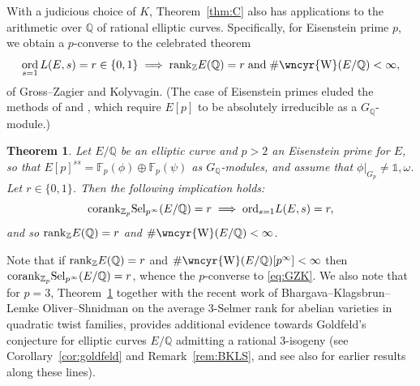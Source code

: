 \documentclass[10pt]{amsart}
\newcommand{\sha}{\text{\wncyr{W}}}
\numberwithin{equation}{section}
\newtheorem{theorem}{Theorem}
\theoremstyle{definition}
\theoremstyle{remark}
\newcommand{\Z}{\mathbb{Z}}
\newcommand{\bQ}{\mathbb{Q}}
\newcommand{\Q}{\mathbb{Q}}
\DeclareMathOperator{\ord}{ord}
\begin{document}
With a judicious choice of $K$, Theorem~\ref{thm:C} also has applications to the arithmetic over $\Q$ of rational elliptic curves. Specifically, for Eisenstein prime $p$, we obtain a $p$-converse to the celebrated theorem 
\begin{equation}\label{eq:GZK}
\ord_{s=1}L(E,s)=r \in \{0,1\}\;\Longrightarrow\;
{\rm rank}_\Z E(\Q)=r\;\textrm{and}\;
\#\sha(E/\bQ)<\infty,
\end{equation}
of Gross--Zagier and Kolyvagin. (The case of Eisenstein primes eluded the methods of 
\cite{pCONVskinner} and \cite{wei-zhang}, which require $E[p]$ to be absolutely irreducible as a $G_\bQ$-module.)

\begin{theorem}\label{thm:E}
Let $E/\mathbb{Q}$ be an elliptic curve and $p>2$ an Eisenstein prime for $E$, so that $E[p]^{ss}=\mathbb{F}_p(\phi)\oplus\mathbb{F}_p(\psi)$ as $G_\Q$-modules, and assume that $\phi\vert_{G_p}\neq\mathds{1},\omega$. Let $r\in\{0,1\}$. Then the following implication holds:
\[
{\rm corank}_{\Z_p}{\rm Sel}_{p^\infty}(E/\Q)=r
\;\Longrightarrow\;
{\rm ord}_{s=1}L(E,s)=r,
\]
and so ${\rm rank}_\Z E(\Q)=r$ and $\#\sha(E/\Q)<\infty$.
\end{theorem}

Note that if ${\rm rank}_{\Z}E(\Q)=r$ and $\#\sha(E/\Q)[p^\infty]<\infty$ then ${\rm corank}_{\Z_p}{\rm Sel}_{p^\infty}(E/\Q)=r$,
whence the $p$-converse to \eqref{eq:GZK}. We also note that for $p=3$, Theorem~\ref{thm:E} together with the recent work of Bhargava--Klagsbrun--Lemke Oliver--Shnidman \cite{BKLS} on the average $3$-Selmer rank for abelian varieties in quadratic twist families, 
provides additional evidence
towards Goldfeld's conjecture \cite{goldfeld} for elliptic curves $E/\bQ$ admitting a rational $3$-isogeny (see Corollary~\ref{cor:goldfeld} and Remark~\ref{rem:BKLS}, and see also \cite{kriz-li} for earlier results along these lines).
\end{document}
